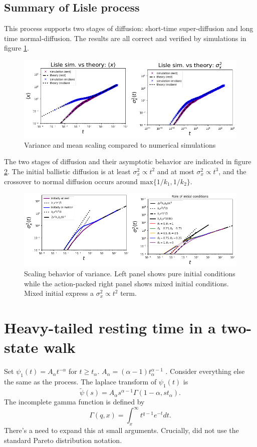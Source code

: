 \documentclass[11pt]{article}
\newcommand\be{\begin{equation}} %
\newcommand\ee{\end{equation}}   %
\begin{document}
\subsection{Summary of Lisle process}
This process supports two stages of diffusion: short-time super-diffusion and long time normal-diffusion.
The results are all correct and verified by simulations in figure \ref{fig:lislesims}.
\begin{figure}[h]
	\centering
	\includegraphics[width=\linewidth,keepaspectratio]{combo1.png}
	\caption{Variance and mean scaling compared to numerical simulations}
	\label{fig:lislesims}
\end{figure}
The two stages of diffusion and their asymptotic behavior are indicated in figure \ref{fig:lisledif}. The initial ballistic diffusion is at least $\sigma_x^2 \propto t^2$ and at most $\sigma_x^2 \propto t^3$, and the crossover to normal diffusion occurs around $\text{max}\{1/k_1,1/k_2\}.$
\begin{figure}[h]
	\centering
	\includegraphics[width=\linewidth,keepaspectratio]{combo2.png}
	\caption{Scaling behavior of variance. Left panel shows pure initial conditions while the action-packed right panel shows mixed initial conditions. Mixed initial express a $\sigma_x^2 \propto t^2$ term. }
	\label{fig:lisledif}
\end{figure}

\section{Heavy-tailed resting time in a two-state walk}
Set $\psi_1(t) = A_\alpha t^{-\alpha}$ for $t\geq t_\alpha$.
$A_\alpha = (\alpha-1)t_\alpha^{\alpha-1}$ \citep[e.g.][eq. 12]{Weeks1996}.
Consider everything else the same as the \citet{Lisle1998} process.
The laplace transform of $\psi_1(t)$ is
\be \tilde{\psi}(s) = A_\alpha s^{\alpha-1}\Gamma(1-\alpha,st_\alpha).\ee
The incomplete gamma function is defined by 
\be \Gamma(q,x) = \int_x^\infty t^{q-1}e^{-t}dt.\ee
There's a need to expand this at small arguments.
Crucially, \citet{Weeks1996} did not use the standard Pareto distribution notation.
\end{document}

